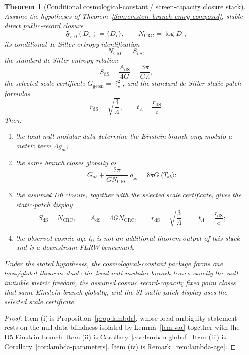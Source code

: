 \documentclass[11pt]{article}
\newtheorem{theorem}{Theorem}[section]
\begin{document}
\begin{theorem}[Conditional cosmological-constant / screen-capacity closure stack]\label{thm:lambda-stack}
Assume the hypotheses of
Theorem~\ref{thm:einstein-branch-entry-composed}, stable direct public-record closure
\[
\mathfrak F_{r,0}(D_\star)=\{D_\star\},
\qquad N_{\mathrm{CRC}}=\log D_\star,
\]
its conditional de Sitter entropy identification
\[
N_{\mathrm{CRC}}=S_{\mathrm{dS}},
\]
\noindent the standard de Sitter entropy relation
\[
S_{\mathrm{dS}}=\frac{A_{\mathrm{dS}}}{4G}=\frac{3\pi}{G\Lambda},
\]
the selected scale certificate \(G_{\mathrm{geom}}=\ell_\star^2\),
and the standard de Sitter static-patch formulas
\[
r_{\mathrm{dS}}=\sqrt{\frac{3}{\Lambda}},
\qquad
t_\Lambda=\frac{r_{\mathrm{dS}}}{c}.
\]
Then:
\begin{enumerate}[label=\textup{(\roman*)},leftmargin=2em]
\item the local null-modular data determine the Einstein branch only modulo a metric term \(\Lambda g_{ab}\);
\item the same branch closes globally as
\[
G_{ab}+\frac{3\pi}{G N_{\mathrm{CRC}}}\,g_{ab}=8\pi G\,\langle T_{ab}\rangle;
\]
\item the assumed D6 closure, together with the selected scale certificate, gives the static-patch display
\[
S_{\mathrm{dS}}=N_{\mathrm{CRC}},
\qquad
A_{\mathrm{dS}}=4G N_{\mathrm{CRC}},
\qquad
r_{\mathrm{dS}}=\sqrt{\frac{3}{\Lambda}},
\qquad
t_\Lambda=\frac{r_{\mathrm{dS}}}{c};
\]
\item the observed cosmic age \(t_0\) is not an additional theorem output of this stack and is a downstream FLRW benchmark.
\end{enumerate}
Under the stated hypotheses, the cosmological-constant package forms one local/global theorem stack:
the local null-modular branch leaves exactly the null-invisible metric freedom, the assumed cosmic
record-capacity fixed point closes that same Einstein branch globally, and the SI static-patch
display uses the selected scale certificate.
\end{theorem}

\begin{proof}
Item \textup{(i)} is Proposition~\ref{prop:lambda}, whose local ambiguity statement rests on the null-data blindness isolated by Lemma~\ref{lem:vac} together with the D5 Einstein branch. Item \textup{(ii)} is Corollary~\ref{cor:lambda-global}. Item \textup{(iii)} is Corollary~\ref{cor:lambda-parameters}. Item \textup{(iv)} is Remark~\ref{rem:lambda-age}.
\end{proof}
\end{document}
